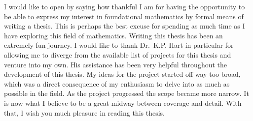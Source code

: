 \documentclass[../main.tex]{subfiles}
\begin{document}
I would like to open by saying how thankful I am for having the opportunity to be able to express my interest in foundational mathematics by formal means of writing a thesis. This is perhaps the best excuse for spending as much time as I have exploring this field of mathematics. Writing this thesis has been an extremely fun journey. I would like to thank Dr.\ K.P. Hart in particular for allowing me to diverge from the available list of projects for this thesis and venture into my own. His assistance has been very helpful throughout the development of this thesis. My ideas for the project started off way too broad, which was a direct consequence of my enthusiasm to delve into as much as possible in the field. As the project progressed the scope became more narrow. It is now what I believe to be a great midway between coverage and detail. With that, I wish you much pleasure in reading this thesis.
\end{document}
